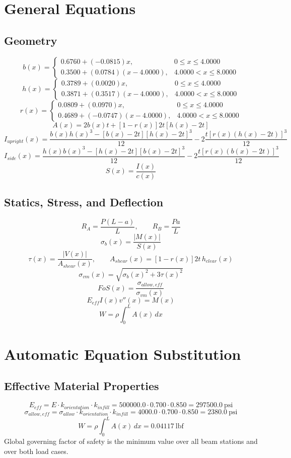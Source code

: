 \documentclass[11pt]{article}
\begin{document}
\section*{General Equations}
\subsection*{Geometry}
\[
b(x)=\begin{cases}0.6760 + (-0.0815)x, & 0 \le x \le 4.0000\\0.3500 + (0.0784)(x-4.0000), & 4.0000 < x \le 8.0000\end{cases}
\]
\[
h(x)=\begin{cases}0.3789 + (0.0020)x, & 0 \le x \le 4.0000\\0.3871 + (0.3517)(x-4.0000), & 4.0000 < x \le 8.0000\end{cases}
\]
\[
r(x)=\begin{cases}0.0809 + (0.0970)x, & 0 \le x \le 4.0000\\0.4689 + (-0.0747)(x-4.0000), & 4.0000 < x \le 8.0000\end{cases}
\]
\[
A(x)=2b(x)t+[1-r(x)]2t[h(x)-2t]
\]
\[
I_{upright}(x)=\frac{b(x)h(x)^3-[b(x)-2t][h(x)-2t]^3}{12}-2\frac{t[r(x)(h(x)-2t)]^3}{12}
\]
\[
I_{side}(x)=\frac{h(x)b(x)^3-[h(x)-2t][b(x)-2t]^3}{12}-2\frac{t[r(x)(b(x)-2t)]^3}{12}
\]
\[
S(x)=\frac{I(x)}{c(x)}
\]

\subsection*{Statics, Stress, and Deflection}
\[
R_A=\frac{P(L-a)}{L}, \qquad R_B=\frac{Pa}{L}
\]
\[
\sigma_b(x)=\frac{|M(x)|}{S(x)}
\]
\[
\tau(x)=\frac{|V(x)|}{A_{shear}(x)}, \qquad A_{shear}(x)=[1-r(x)]2t\,h_{clear}(x)
\]
\[
\sigma_{vm}(x)=\sqrt{\sigma_b(x)^2+3\tau(x)^2}
\]
\[
FoS(x)=\frac{\sigma_{allow,eff}}{\sigma_{vm}(x)}
\]
\[
E_{eff}I(x)v''(x)=M(x)
\]
\[
W=\rho\int_0^L A(x)\,dx
\]

\section*{Automatic Equation Substitution}
\subsection*{Effective Material Properties}
\[E_{eff} = E \cdot k_{orientation} \cdot k_{infill} = 500000.0 \cdot 0.700 \cdot 0.850 = 297500.0\ \mathrm{psi}\]
\[\sigma_{allow,eff} = \sigma_{allow} \cdot k_{orientation} \cdot k_{infill} = 4000.0 \cdot 0.700 \cdot 0.850 = 2380.0\ \mathrm{psi}\]
\[W = \rho \int_0^L A(x)\,dx = 0.04117\ \mathrm{lbf}\]
Global governing factor of safety is the minimum value over all beam stations and over both load cases.
\end{document}
